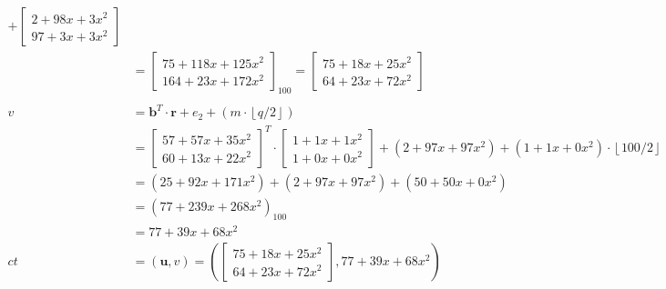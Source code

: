 \begin{align*}
  +
  \begin{bmatrix}2+98x+3x^2 \\ 97+3x+3x^2 \end{bmatrix}                                                      \\
               & = \begin{bmatrix}75+118x+125x^2 \\ 164+23x+172x^2 \end{bmatrix}_{100}
  = 
  \begin{bmatrix}75+18x+25x^2 \\ 64+23x+72x^2 \end{bmatrix}                                                  \\
  \\
  v            & = \textbf{b}^T \cdot \textbf{r} + e_2 + (m\cdot\left\lfloor q/2\right\rfloor)               \\
               & =\begin{bmatrix}
                    57+57x+35x^2 \\
                    60+13x+22x^2
                  \end{bmatrix} ^T
  \cdot
  \begin{bmatrix}1+1x+1x^2 \\ 1+0x+0x^2 \end{bmatrix}
  + (2+97x+97x^2) + (1+1x+0x^2) \cdot \left\lfloor 100/2\right\rfloor                                        \\
               & = (25+92x+171x^2) + (2+97x+97x^2) + (50+50x+0x^2)                                           \\
               & = (77+239x+268x^2)_{100}                                                                    \\
               & = 77+39x+68x^2                                                                              \\
  ct           & = (\textbf{u}, v) = \left (
  \begin{bmatrix}75+18x+25x^2 \\ 64+23x+72x^2 \end{bmatrix}, 77+39x+68x^2   \right )                         \\
\end{align*}

